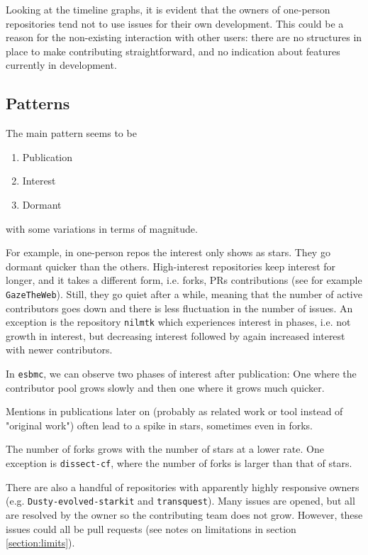\documentclass[10pt,a4paper]{scrartcl}
\begin{document}
Looking at the timeline graphs,
it is evident that the owners of one-person repositories tend not to use issues for their own development.
This could be a reason for the non-existing interaction with other users:
there are no structures in place to make contributing straightforward,
and no indication about features currently in development.

\subsection*{Patterns}

The main pattern seems to be 
\begin{enumerate}
    \item Publication
    \item Interest
    \item Dormant
\end{enumerate}
with some variations in terms of magnitude.

For example, in one-person repos the interest only shows as stars.
They go dormant quicker than the others.
High-interest repositories keep interest for longer,
and it takes a different form, i.e. forks, PRs contributions (see for example \verb|GazeTheWeb|). 
Still, they go quiet after a while,
meaning that the number of active contributors goes down and there is less fluctuation in the number of issues. 
An exception is the repository \verb|nilmtk| which experiences interest in phases, i.e. not growth in interest,
but decreasing interest followed by again increased interest with newer contributors.

In \verb|esbmc|, we can observe two phases of interest after publication:
One where the contributor pool grows slowly and then one where it grows much quicker.

Mentions in publications later on (probably as related work or tool instead of "original work")
often lead to a spike in stars, sometimes even in forks.

The number of forks grows with the number of stars at a lower rate.
One exception is \verb|dissect-cf|, where the number of forks is larger than that of stars.

There are also a handful of repositories with apparently highly responsive owners
(e.g. \verb|Dusty-evolved-starkit| and \verb|transquest|).
Many issues are opened, but all are resolved by the owner so the contributing team does not grow.
However, these issues could all be pull requests (see notes on limitations in section \ref{section:limits}).
\end{document}
